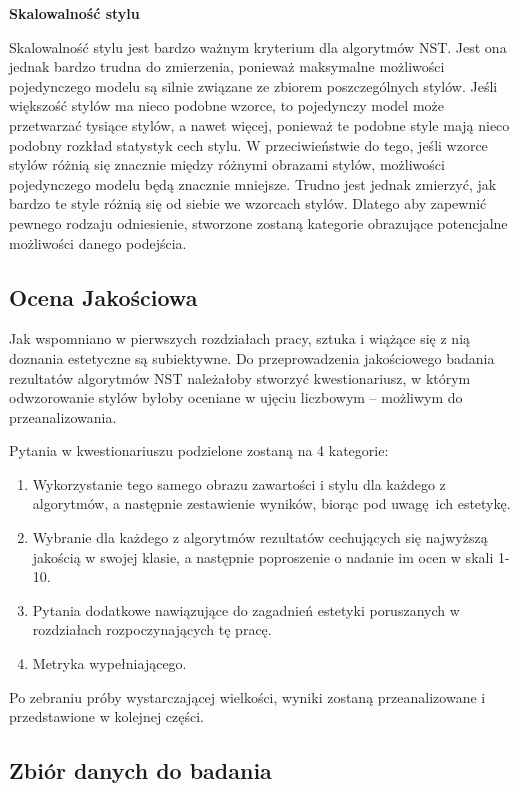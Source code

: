 \documentclass[12pt]{article}
\begin{document}
\noindent\textbf{Skalowalność stylu}

Skalowalność stylu jest bardzo ważnym kryterium dla algorytmów NST. Jest ona jednak bardzo trudna do zmierzenia, ponieważ maksymalne możliwości pojedynczego modelu są silnie związane ze zbiorem poszczególnych stylów. Jeśli większość stylów ma nieco podobne wzorce, to pojedynczy model może przetwarzać tysiące stylów, a nawet więcej, ponieważ te podobne style mają nieco podobny rozkład statystyk cech stylu. W przeciwieństwie do tego, jeśli wzorce stylów różnią się znacznie między różnymi obrazami stylów, możliwości pojedynczego modelu będą znacznie mniejsze. Trudno jest jednak zmierzyć, jak bardzo te style różnią się od siebie we wzorcach stylów. Dlatego aby zapewnić pewnego rodzaju odniesienie, stworzone zostaną kategorie obrazujące potencjalne możliwości danego podejścia.

\subsection{Ocena Jakościowa}

\indent

Jak wspomniano w pierwszych rozdziałach pracy, sztuka i wiążące się z nią doznania estetyczne są subiektywne. Do przeprowadzenia jakościowego badania rezultatów algorytmów NST należałoby stworzyć kwestionariusz, w którym odwzorowanie stylów byłoby oceniane w ujęciu liczbowym – możliwym do przeanalizowania.

Pytania w kwestionariuszu podzielone zostaną na 4 kategorie:
\begin{enumerate}
    \item Wykorzystanie tego samego obrazu zawartości i stylu dla każdego z algorytmów, a następnie zestawienie wyników, biorąc pod uwagę ich estetykę.
    \item Wybranie dla każdego z algorytmów rezultatów cechujących się najwyższą jakością w swojej klasie, a następnie poproszenie o nadanie im ocen w skali 1-10.
    \item Pytania dodatkowe nawiązujące do zagadnień estetyki poruszanych w rozdziałach rozpoczynających tę pracę.
    \item Metryka wypełniającego.
\end{enumerate}
\indent

Po zebraniu próby wystarczającej wielkości, wyniki zostaną przeanalizowane i przedstawione w kolejnej części.

\subsection{Zbiór danych do badania}
\end{document}
